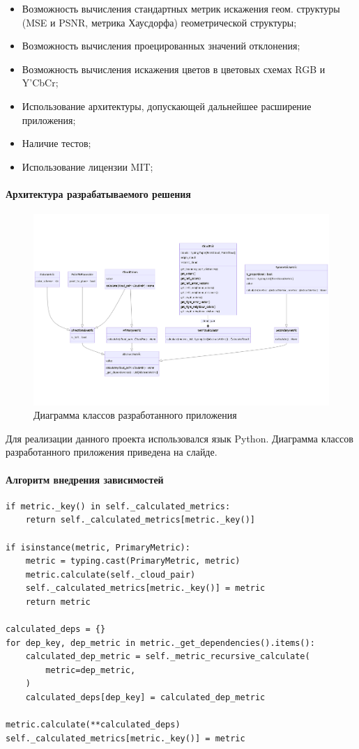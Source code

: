 \documentclass[a4paper,12pt]{extreport}
\begin{document}
\begin{itemize}
    \item Возможность вычисления стандартных метрик искажения геом. структуры (MSE и PSNR,
    метрика Хаусдорфа) геометрической структуры;
    \item Возможность вычисления проецированных значений отклонения;
    \item Возможность вычисления искажения цветов в цветовых схемах RGB и Y'CbCr;
    \item Использование архитектуры, допускающей дальнейшее расширение
    приложения;
    \item Наличие тестов;
    \item Использование лицензии MIT;
\end{itemize}

\paragraph{Архитектура разрабатываемого решения}

\begin{figure}[H]
    \centering
    \includegraphics[width=0.7\linewidth]{assets/classes.png}
    \caption{Диаграмма классов разработанного приложения}
    \label{img:metric_classes}
\end{figure}

Для реализации данного проекта использовался язык Python. Диаграмма классов
разработанного приложения приведена на слайде.

\paragraph{Алгоритм внедрения зависимостей}

\begin{lstlisting}[caption={
    Алгоритм подсчёта метрик.
}, label={lst:calculator_recursive_calculate}]
if metric._key() in self._calculated_metrics:
    return self._calculated_metrics[metric._key()]

if isinstance(metric, PrimaryMetric):
    metric = typing.cast(PrimaryMetric, metric)
    metric.calculate(self._cloud_pair)
    self._calculated_metrics[metric._key()] = metric
    return metric

calculated_deps = {}
for dep_key, dep_metric in metric._get_dependencies().items():
    calculated_dep_metric = self._metric_recursive_calculate(
        metric=dep_metric,
    )
    calculated_deps[dep_key] = calculated_dep_metric

metric.calculate(**calculated_deps)
self._calculated_metrics[metric._key()] = metric
\end{lstlisting}
\end{document}
